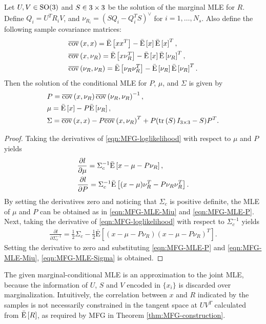 \begin{theorem} \label{thm:MFG-MLE-conditional}
	Let $U,V\in\mathrm{SO}(3)$ and $S\in\real{3\times 3}$ be the solution of the marginal MLE for $R$.
	Define $Q_i = U^TR_iV$, and $\nu_{R_i} = (SQ_i-Q_i^TS)^\vee$ for $i=1,\ldots,N_s$.
	Also define the following sample covariance matrices:
	\begin{align}
		&\overline{\mathrm{cov}}\left( x, x \right) = \bar{\mathrm{E}}\left[ xx^T \right] - \bar{\mathrm{E}}\left[ x \right]\bar{\mathrm{E}}\left[ x \right]^T,\\
		&\overline{\mathrm{cov}}\left( x, \nu_R \right) = \bar{\mathrm{E}}\left[ x\nu_R^T \right] - \bar{\mathrm{E}}\left[ x \right]\bar{\mathrm{E}}\left[ \nu_R \right]^T, \\
		&\overline{\mathrm{cov}}\left( \nu_R, \nu_R \right) = \bar{\mathrm{E}}\left[ \nu_R\nu_R^T \right] - \bar{\mathrm{E}}\left[ \nu_R \right]\bar{\mathrm{E}}\left[ \nu_R \right]^T.
	\end{align}
	Then the solution of the conditional MLE for $P$, $\mu$, and $\Sigma$ is given by
	\begin{align}
		&P = \overline{\mathrm{cov}}\left( x, \nu_R \right) \overline{\mathrm{cov}}\left( \nu_R, \nu_R \right)^{-1}, \label{eqn:MFG-MLE-P} \\
		&\mu = \bar{\mathrm{E}}\left[ x \right] - P\bar{\mathrm{E}}\left[ \nu_R \right], \label{eqn:MFG-MLE-Miu} \\
		&\Sigma = \overline{\mathrm{cov}}\left( x, x \right) - P\overline{\mathrm{cov}}\left( x, \nu_R \right)^T + P(\mathrm{tr}\left( S \right)I_{3\times 3}-S)P^T. \label{eqn:MFG-MLE-Sigma}
	\end{align}
\end{theorem}
\begin{proof}
	Taking the derivatives of \eqref{eqn:MFG-loglikelihood} with respect to $\mu$ and $P$ yields
	\begin{align*}
		&\frac{\partial l}{\partial\mu} = \Sigma_c^{-1} \bar{\mathrm{E}}\left[ x-\mu-{P}\nu_{R} \right], \\
		&\frac{\partial l}{\partial P} = \Sigma_c^{-1} \bar{\mathrm{E}}\left[ (x-{\mu})\nu_R^T-{P}\nu_R\nu_R^T \right].
	\end{align*}
	By setting the derivatives zero and noticing that $\Sigma_c$ is positive definite, the MLE of ${\mu}$ and ${P}$ can be obtained as in \eqref{eqn:MFG-MLE-Miu} and \eqref{eqn:MFG-MLE-P}.
	Next, taking the derivative of \eqref{eqn:MFG-loglikelihood} with respect to $\Sigma_c^{-1}$ yields
	\begin{align*}
		\frac{\partial l}{\partial\Sigma_c^{-1}} = \frac{1}{2}{\Sigma}_c -\frac{1}{2}\bar{\mathrm{E}}\left[(x-\mu-P\nu_{R})
		(x-\mu-{P}\nu_{R})^T\right]. \nonumber
	\end{align*}
	Setting the derivative to zero and substituting \eqref{eqn:MFG-MLE-P} and \eqref{eqn:MFG-MLE-Miu}, \eqref{eqn:MFG-MLE-Sigma} is obtained.
\end{proof}

The given marginal-conditional MLE is an approximation to the joint MLE, because the information of $U$, $S$ and $V$ encoded in $\{x_i\}$ is discarded over marginalization.
Intuitively, the correlation between $x$ and $R$ indicated by the samples is not necessarily constrained in the tangent space at $UV^T$ calculated from $\bar{\mathrm{E}}\left[ R \right]$, as required by MFG in Theorem \ref{thm:MFG-construction}.

